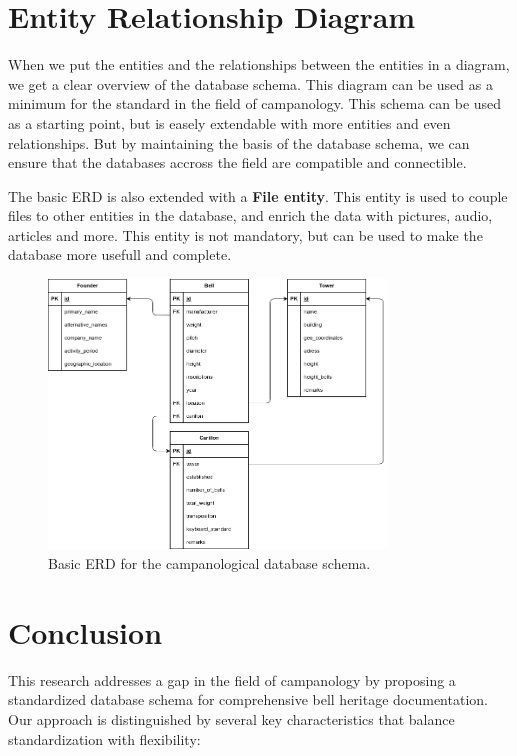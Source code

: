 \documentclass[11pt, a4paper]{article}
\begin{document}
\section{Entity Relationship Diagram}

When we put the entities and the relationships between the entities in a diagram, we get a clear overview of the database schema. This diagram can be used as a minimum for the standard in the field of campanology. This schema can be used as a starting point, but is easely extendable with more entities and even relationships. But by maintaining the basis of the database schema, we can ensure that the databases accross the field are compatible and connectible. 

The basic ERD is also extended with a \textbf{File entity}. This entity is used to couple files to other entities in the database, and enrich the data with pictures, audio, articles and more. This entity is not mandatory, but can be used to make the database more usefull and complete.

\clearpage

\begin{figure}[h!]
    \centering
    \includegraphics[width=0.8\textwidth]{images/basic_erd.png}
    \caption{Basic ERD for the campanological database schema.}
    \label{fig:basic-erd}
\end{figure}

\section{Conclusion}

This research addresses a gap in the field of campanology by proposing a standardized database schema for comprehensive bell heritage documentation. Our approach is distinguished by several key characteristics that balance standardization with flexibility:
\end{document}
